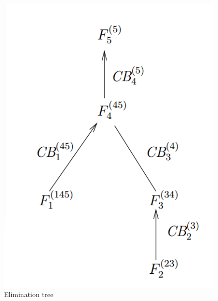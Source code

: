\begin{exm}
\begin{figure}[H]
        \centering
        \includegraphics[width=0.5\linewidth]{png/exmemtree.png}
        \caption{Elimination tree}
        \label{fig::exmemtree}
    \end{figure}
\end{exm}

